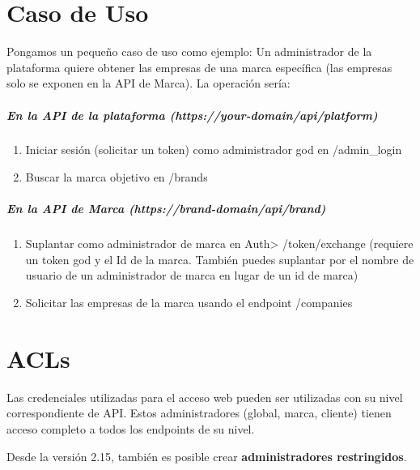 \documentclass[letterpaper,10pt,spanish]{sphinxmanual}
\begin{document}
\chapter{Caso de Uso}
\label{api_rest/use_case:use-case}\label{api_rest/use_case::doc}\label{api_rest/use_case:id1}
Pongamos un pequeño caso de uso como ejemplo: Un administrador de la plataforma quiere obtener las empresas de una marca específica (las empresas solo se exponen en la API de Marca). La operación sería:
\paragraph{En la API de la plataforma (https://your-domain/api/platform)}
\begin{enumerate}
\item {} 
Iniciar sesión (solicitar un token) como administrador god en /admin\_login

\item {} 
Buscar la marca objetivo en /brands

\end{enumerate}
\paragraph{En la API de Marca (https://brand-domain/api/brand)}
\begin{enumerate}
\item {} 
Suplantar como administrador de marca en Auth\textgreater{} /token/exchange (requiere un token god y el Id de la marca. También puedes suplantar por el nombre de usuario de un administrador de marca en lugar de un id de marca)

\item {} 
Solicitar las empresas de la marca usando el endpoint /companies

\end{enumerate}


\chapter{ACLs}
\label{api_rest/acls:acls}\label{api_rest/acls::doc}\label{api_rest/acls:id1}
Las credenciales utilizadas para el acceso web pueden ser utilizadas con su nivel correspondiente de API. Estos administradores (global, marca, cliente) tienen acceso completo a todos los endpoints de su nivel.

Desde la versión 2.15, también es posible crear \textbf{administradores restringidos}.
\end{document}
